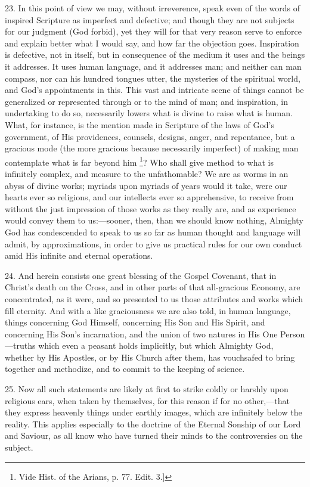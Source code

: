 23. In this point of view we may, without irreverence, speak even
of the words of inspired Scripture as imperfect and defective; and
though they are not subjects for our judgment (God forbid), yet they
will for that very reason serve to enforce and explain better what I
would say, and how far the objection goes. Inspiration is defective,
not in itself, but in consequence of the medium it uses and the beings
it addresses. It uses human language, and it addresses man; and
neither can man compass, nor can his hundred tongues utter, the
mysteries of the spiritual world, and God's appointments in this. This
vast and intricate scene of things cannot be generalized or
represented through or to the mind of man; and inspiration, in
undertaking to do so, necessarily lowers what is divine to raise what
is human. What, for instance, is the mention made in Scripture of the
laws of God's government, of His providences, counsels, designs,
anger, and repentance, but a gracious mode (the more gracious because
necessarily imperfect) of making man contemplate what is far beyond
him \footnote{Vide Hist. of
the Arians, p. 77. Edit. 3.]}? Who shall give
method to what is infinitely complex, and measure to the unfathomable?
We are as worms in an abyss of divine works; myriads upon myriads of
years would it take, were our hearts ever so religions, and our
intellects ever so apprehensive, to receive from without the just
impression of those works as they really are, and as experience would
convey them to us:—sooner, then, than we should know nothing,
Almighty God has condescended to speak to us so far as human thought
and language will admit, by approximations, in order to give us
practical rules for our own conduct amid His infinite and eternal
operations.

24. And herein consists one great blessing of the Gospel Covenant,
that in Christ's death on the Cross, and in other parts of that
all-gracious Economy, are concentrated, as it were, and so presented
to us those attributes and works which fill eternity. And with a like
graciousness we are also told, in human language, things concerning
God Himself, concerning His Son and His Spirit, and concerning His
Son's incarnation, and the union of two natures in His One Person—truths
which even a peasant holds implicitly, but which Almighty God, whether
by His Apostles, or by His Church after them, has vouchsafed to bring
together and methodize, and to commit to the keeping of science.

25. Now all such statements are likely at first to strike coldly or
harshly upon religious ears, when taken by themselves, for this reason
if for no other,—that they express heavenly things under earthly
images, which are infinitely below the reality. This applies
especially to the doctrine of the Eternal Sonship of our Lord and
Saviour, as all know who have turned their minds to the controversies
on the subject.

